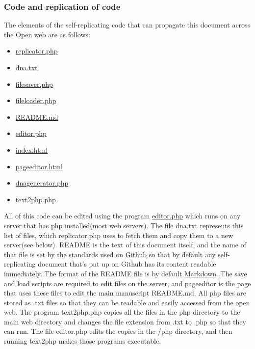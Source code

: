 \documentclass[12pt,a4paper]{amsart}
\numberwithin{equation}{section}
\begin{document}
\subsubsection{Code and replication of
code}\label{code-and-replication-of-code}

The elements of the self-replicating code that can propagate this
document across the Open web are as follows:

\begin{itemize}
\tightlist
\item
  \href{php/replicator.txt}{replicator.php}
\item
  \href{data/dna.txt}{dna.txt}
\item
  \href{php/filesaver.txt}{filesaver.php}
\item
  \href{php/fileloader.txt}{fileloader.php}
\item
  \url{README.md}
\item
  \href{php/editor.txt}{editor.php}
\item
  \url{index.html}
\item
  \url{pageeditor.html}
\item
  \href{php/dnagenerator.txt}{dnagenerator.php}
\item
  \href{php/text2php.txt}{text2php.php}
\end{itemize}

All of this code can be edited using the program \url{editor.php} which
runs on any server that has \href{https://www.php.net/}{php}
installed(most web servers). The file dna.txt represents this list of
files, which replicator.php uses to fetch them and copy them to a new
server(see below). README is the text of this document itself, and the
name of that file is set by the standards used on
\href{https://github.com/}{Github} so that by default any
self-replicating document that's put up on Github has its content
readable immediately. The format of the README file is by default
\href{https://daringfireball.net/projects/markdown/syntax}{Markdown}.
The save and load scripts are required to edit files on the server, and
pageeditor is the page that uses these files to edit the main manuscript
README.md. All php files are stored as .txt files so that they can be
readable and easily accessed from the open web. The program text2php.php
copies all the files in the php directory to the main web directory and
changes the file extension from .txt to .php so that they can run. The
file editor.php edits the copies in the /php directory, and then running
text2php makes those programs executable.
\end{document}

